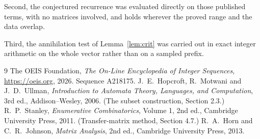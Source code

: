 \documentclass[11pt,a4paper]{article}
\theoremstyle{plain}
\theoremstyle{definition}
\begin{document}
Second, the conjectured recurrence was evaluated directly on those published terms, with no
matrices involved, and holds wherever the proved range and the data overlap.

Third, the annihilation test of Lemma~\ref{lem:crit} was carried out in exact integer
arithmetic on the whole vector rather than on a sampled prefix.

\begin{thebibliography}{9}
 The OEIS Foundation, \emph{The On-Line Encyclopedia of Integer
Sequences}, \url{https://oeis.org}, 2026. Sequence A218175.
 J.~E.~Hopcroft, R.~Motwani and J.~D.~Ullman, \emph{Introduction to Automata
Theory, Languages, and Computation}, 3rd ed., Addison--Wesley, 2006. (The subset
construction, Section 2.3.)
 R.~P.~Stanley, \emph{Enumerative Combinatorics}, Volume 1, 2nd ed.,
Cambridge University Press, 2011. (Transfer-matrix method, Section 4.7.)
 R.~A.~Horn and C.~R.~Johnson, \emph{Matrix Analysis}, 2nd ed., Cambridge
University Press, 2013.
\end{thebibliography}
\end{document}

